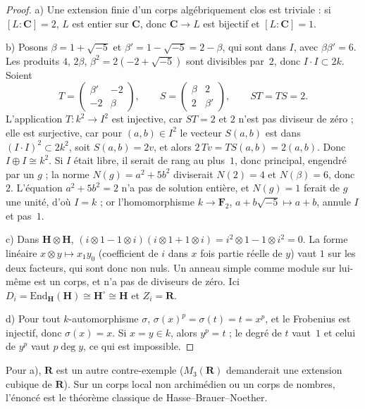 \begin{proof}
a) Une extension finie d'un corps algébriquement clos est triviale : si $[L:\mathbf C] = 2$, $L$ est entier sur $\mathbf C$, donc $\mathbf C \to L$ est bijectif et $[L:\mathbf C] = 1$.

b) Posons $\beta = 1 + \sqrt{-5}$ et $\beta' = 1 - \sqrt{-5} = 2 - \beta$, qui sont dans $I$, avec $\beta\beta' = 6$. Les produits $4$, $2\beta$, $\beta^2 = 2(-2 + \sqrt{-5})$ sont divisibles par~$2$, donc $I \cdot I \subset 2k$. Soient
\[ T = \begin{pmatrix} \beta' & -2 \\ -2 & \beta \end{pmatrix}, \qquad S = \begin{pmatrix} \beta & 2 \\ 2 & \beta' \end{pmatrix}, \qquad ST = TS = 2. \]
L'application $T : k^2 \to I^2$ est injective, car $ST = 2$ et $2$ n'est pas diviseur de zéro ; elle est surjective, car pour $(a, b) \in I^2$ le vecteur $S(a, b)$ est dans $(I\cdot I)^2 \subset 2k^2$, soit $S(a,b) = 2v$, et alors $2\,Tv = TS(a,b) = 2(a,b)$. Donc $I \oplus I \cong k^2$. Si $I$ était libre, il serait de rang au plus~$1$, donc principal, engendré par un $g$ ; la norme $N(g) = a^2 + 5b^2$ diviserait $N(2) = 4$ et $N(\beta) = 6$, donc~$2$. L'équation $a^2 + 5b^2 = 2$ n'a pas de solution entière, et $N(g) = 1$ ferait de $g$ une unité, d'où $I = k$ ; or l'homomorphisme $k \to \mathbf F_2$, $a + b\sqrt{-5} \mapsto a + b$, annule $I$ et pas~$1$.

c) Dans $\mathbf H \otimes \mathbf H$, $(i \otimes 1 - 1 \otimes i)(i \otimes 1 + 1 \otimes i) = i^2 \otimes 1 - 1 \otimes i^2 = 0$. La forme linéaire $x \otimes y \mapsto x_1 y_0$ (coefficient de $i$ dans $x$ fois partie réelle de $y$) vaut $1$ sur les deux facteurs, qui sont donc non nuls. Un anneau simple comme module sur lui-même est un corps, et n'a pas de diviseurs de zéro. Ici $D_i = \mathrm{End}_{\mathbf H}(\mathbf H) \cong \mathbf H^{\circ} \cong \mathbf H$ et $Z_i = \mathbf R$.

d) Pour tout $k$-automorphisme $\sigma$, $\sigma(x)^p = \sigma(t) = t = x^p$, et le Frobenius est injectif, donc $\sigma(x) = x$. Si $x = y \in k$, alors $y^p = t$ ; le degré de $t$ vaut~$1$ et celui de $y^p$ vaut $p\deg y$, ce qui est impossible.
\end{proof}

\noindent Pour a), $\mathbf R$ est un autre contre-exemple ($M_3(\mathbf R)$ demanderait une extension cubique de $\mathbf R$). Sur un corps local non archimédien ou un corps de nombres, l'énoncé est le théorème classique de Hasse--Brauer--Noether.

